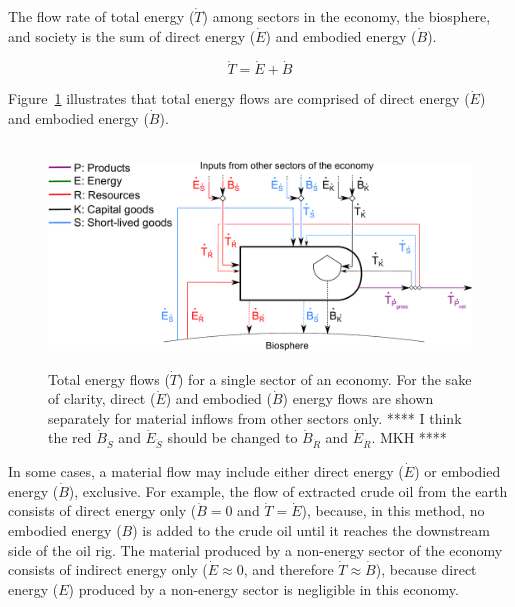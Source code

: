 The flow rate of total energy 
($\dot{T}$)
among sectors in 
the economy, the biosphere, and society is the sum of
direct energy ($\dot{E}$) and embodied 
energy ($\dot{B}$).

\begin{equation} \label{eq:T_dot_def}
	\dot{T} = \dot{E} + \dot{B}
\end{equation}

\noindent Figure~\ref{fig:embodied_single_producer} illustrates
that total energy flows are comprised of
direct energy ($\dot{E}$) and embodied energy ($\dot{B}$). 

\begin{figure}[!ht]
	\centering\
	\includegraphics[width=.9\textwidth]{Part_1/Chapter_Embodied/images/PERKS_basic_unit_embodied_energy_content.pdf}
	\caption[Total energy flows for a single sector]{Total energy flows 
	($\dot{T}$) for a single sector of an economy. 
	For the sake of clarity, 
	direct ($\dot{E}$) and embodied ($\dot{B}$) energy flows
	are shown separately for material inflows from other sectors only.
	**** I think the red $\dot{B}_{\dot{S}}$ and $\dot{E}_{\dot{S}}$
	should be changed to $\dot{B}_{\dot{R}}$ and $\dot{E}_{\dot{R}}$. MKH ****}
\label{fig:embodied_single_producer}
\end{figure}

In some cases, a material flow may include 
either direct energy ($\dot{E}$) 
or embodied energy ($\dot{B}$), exclusive. 
For example, the flow of extracted crude oil from the earth 
consists of direct energy only ($\dot{B} = 0$ and $\dot{T} = \dot{E}$), 
because, in this method, no embodied energy ($B$) is added 
to the crude oil until it reaches the downstream side of the oil rig.
The material produced by a non-energy sector of the economy 
consists of indirect energy only ($\dot{E} \approx 0$, 
and therefore $\dot{T} \approx \dot{B}$), 
because direct energy ($E$) produced by 
a non-energy sector is negligible in this economy. 

